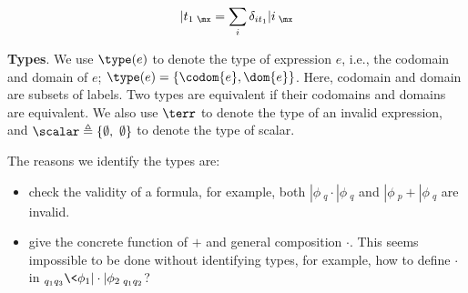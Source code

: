 $$|t_1\>_\mx = \sum_i \delta_{it_1}|i\>_\mx$$



\iffalse

\noindent\textbf{Types}. 
We use $\type(e)$ to denote the type of expression $e$, i.e., the codomain and domain of $e$; $\type(e) = \{\codom{e}, \dom{e}\}$. Here, codomain and domain are subsets of labels.
Two types are equivalent if their codomains and domains are equivalent. We also use $\terr$ to denote the type of an invalid expression, and $\scalar\triangleq\{\emptyset,\ \emptyset\}$ to denote the type of scalar.

The reasons we identify the types are:
\begin{itemize}
    \item[] check the validity of a formula, for example, both $|\phi\>_q\cdot|\phi\>_q$ and $|\phi\>_p + |\phi\>_q$ are invalid.
    \item[] give the concrete function of $+$ and general composition $\cdot$. This seems impossible to be done without identifying types, for example, how to define $\cdot$ in ${}_{q_1q_3}\<\phi_1|\cdot|\phi_2\>_{q_1q_2}$?
\end{itemize}

